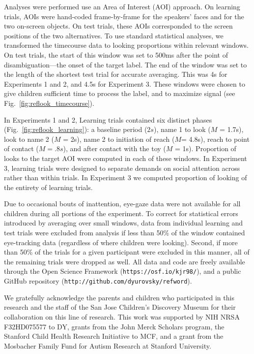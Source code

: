 \documentclass{pnastwo}
\begin{document}
\begin{article}
\begin{materials}
\setlength{\parskip}{0em}

Analyses were performed use an Area of Interest (AOI) approach. On learning trials, AOIs were hand-coded frame-by-frame for the speakers' faces and for the two on-screen objects. On test trials, these AOIs corresponded to the screen positions of the two alternatives. To use standard statistical analyses, we transformed the timecourse data to looking proportions within relevant windows. On test trials, the start of this window was set to 500ms after the point of disambiguation---the onset of the target label. The end of the window was set to the length of the shortest test trial for accurate averaging. This was 4s for Experiments 1 and 2, and 4.5s for Experiment 3. These windows were chosen to give children sufficient time to process the label, and to maximize signal (see Fig.~\ref{fig:reflook_timecourse}).

In Experiments 1 and 2, Learning trials contained six distinct phases (Fig.~\ref{fig:reflook_learning}): a baseline period ($2s$), name 1 to look ({\small$M$ = 1.7s}), look to name 2 ({\small$M$ = 2s}), name 2 to initiation of reach ({\small$M$= 4.8s}), 	reach to point of contact ({\small$M = .8s$}), and after contact with the toy ({\small$M$ = 1s}). Proportion of looks to the target AOI were computed in each of these windows. In Experiment 3, learning trials were designed to separate demands on social attention across rather than within trials. In Experiment 3 we computed proportion of looking of the entirety of learning trials.

Due to occasional bouts of inattention, eye-gaze data were not available for all children during all portions of the experiment. To correct for statistical errors introduced by averaging over small windows, data from individual learning and test trials were excluded from analysis if less than 50\% of the window contained eye-tracking data (regardless of where children were looking). Second, if more than 50\% of the trials for a given participant were excluded in this manner, all of the remaining trials were dropped as well. All data and code are freely available through the Open Science Framework (\small{\tt{https://osf.io/kjr98/}}), and a public GitHub repository (\small{\tt{http://github.com/dyurovsky/refword}}).

\end{materials}

\begin{acknowledgments}
We gratefully acknowledge the parents and children who participated in this research and the staff of the San Jose Children's Discovery Museum for their collaboration on this line of research. This work was supported by NIH NRSA F32HD075577 to DY, grants from the John Merck Scholars program, the Stanford Child Health Research Initiative to MCF, and a grant from the Mosbacher Family Fund for Autism Research at Stanford University.
\end{acknowledgments}


\linespread{.8}\selectfont


\end{article}
\end{document}
